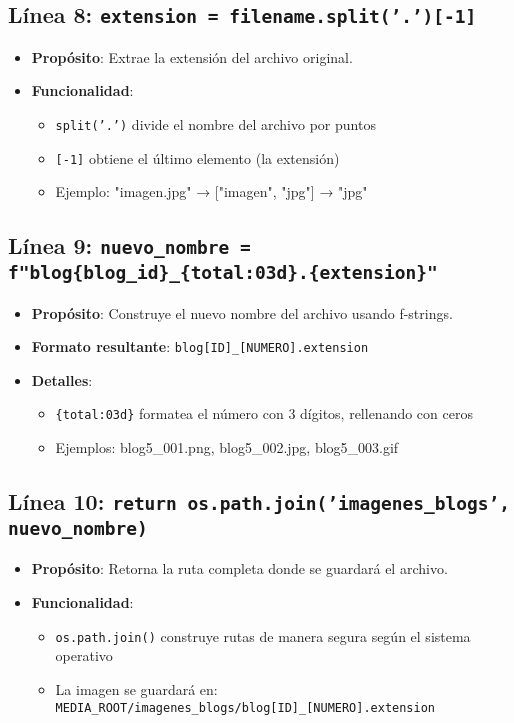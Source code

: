 \documentclass[12pt,a4paper]{article}
\begin{document}
	\subsection{Línea 8: \texttt{extension = filename.split('.')[-1]}}
	\begin{itemize}
		\item \textbf{Propósito}: Extrae la extensión del archivo original.
		\item \textbf{Funcionalidad}:
		\begin{itemize}
			\item \texttt{split('.')} divide el nombre del archivo por puntos
			\item \texttt{[-1]} obtiene el último elemento (la extensión)
			\item Ejemplo: "imagen.jpg" → ["imagen", "jpg"] → "jpg"
		\end{itemize}
	\end{itemize}
	
	\subsection{Línea 9: \texttt{nuevo\_nombre = f"blog\{blog\_id\}\_\{total:03d\}.\{extension\}"}}
	\begin{itemize}
		\item \textbf{Propósito}: Construye el nuevo nombre del archivo usando f-strings.
		\item \textbf{Formato resultante}: \texttt{blog[ID]\_[NUMERO].extension}
		\item \textbf{Detalles}:
		\begin{itemize}
			\item \texttt{\{total:03d\}} formatea el número con 3 dígitos, rellenando con ceros
			\item Ejemplos: blog5\_001.png, blog5\_002.jpg, blog5\_003.gif
		\end{itemize}
	\end{itemize}
	
	\subsection{Línea 10: \texttt{return os.path.join('imagenes\_blogs', nuevo\_nombre)}}
	\begin{itemize}
		\item \textbf{Propósito}: Retorna la ruta completa donde se guardará el archivo.
		\item \textbf{Funcionalidad}:
		\begin{itemize}
			\item \texttt{os.path.join()} construye rutas de manera segura según el sistema operativo
			\item La imagen se guardará en: \texttt{MEDIA\_ROOT/imagenes\_blogs/blog[ID]\_[NUMERO].extension}
		\end{itemize}
	\end{itemize}
	
\end{document}
